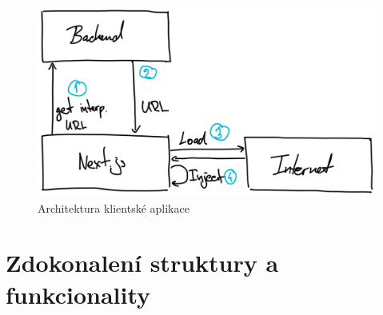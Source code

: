 \begin{figure}[htbp]
   \centering
   \includegraphics[max width=\textwidth]{assets/draft-fe-arch}
   \caption{Architektura klientské aplikace}\label{fig:client-arch}
\end{figure}



\section{Zdokonalení struktury a funkcionality}\label{sec:client-improve}




